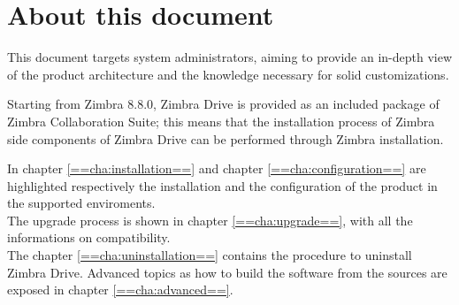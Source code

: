 \section{About this document}
This document targets system administrators, aiming to provide an in-depth view of the product architecture
and the knowledge necessary for solid customizations.
\begin{comment}
TIP:
\end{comment}
\begin{info}
    Starting from Zimbra 8.8.0, Zimbra Drive is provided as an included package of Zimbra Collaboration Suite;
    this means that the installation process of Zimbra side components of Zimbra Drive can be performed 
    through Zimbra installation.
\end{info}
In chapter \ref{==cha:installation==} and chapter \ref{==cha:configuration==} are highlighted respectively the installation
and the configuration of the product in the supported enviroments.\\
The upgrade process is shown in chapter \ref{==cha:upgrade==}, with all the informations on compatibility.\\
The chapter \ref{==cha:uninstallation==} contains the procedure to uninstall Zimbra Drive.
Advanced topics as how to build the software from the sources are exposed in chapter \ref{==cha:advanced==}.
